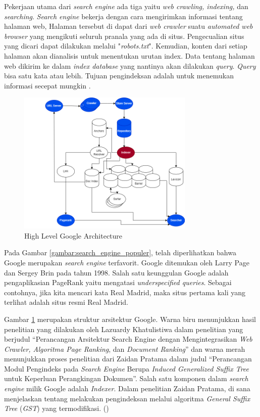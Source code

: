 Pekerjaan utama dari \textit{search engine} ada tiga yaitu \textit{web crawling, indexing,} dan \textit{searching}. \textit{Search engine} bekerja dengan cara mengirimkan informasi tentang halaman web, Halaman tersebut di dapat dari \textit{web crawler} suatu \textit{automated web browser} yang mengikuti seluruh pranala yang ada di situs. Pengecualian situs yang dicari dapat dilakukan melalui "\textit{robots.txt}". Kemudian, konten dari setiap halaman akan dianalisis untuk menentukan urutan index. Data tentang halaman web dikirim ke dalam \textit{index database} yang nantinya akan dilakukan \textit{query}. \textit{Query} bisa satu kata atau lebih. Tujuan pengindeksan adalah untuk menemukan informasi secepat mungkin \citep{seymour2011history}.

\begin{figure}[h]
    \centering
    \includegraphics[width=0.75\textwidth]{gambar/Skema Search Engine Google.png}
    \caption{High Level Google Architecture \citep{brin1998anatomy}}
    \label{gambar:high_level_google_architecture}
\end{figure}

Pada Gambar \ref{gambar:search_engine_populer}, telah diperlihatkan bahwa Google merupakan \textit{search engine} terfavorit. Google ditemukan oleh Larry Page dan Sergey Brin pada tahun 1998. Salah satu keunggulan Google adalah pengaplikasian PageRank  yaitu mengatasi \textit{underspecified queries}. Sebagai contohnya, jika kita mencari kata Real Madrid, maka situs pertama kali yang terlihat adalah situs resmi Real Madrid.

Gambar \ref{gambar:high_level_google_architecture} merupakan struktur arsitektur Google. Warna biru menunjukkan hasil penelitian yang dilakukan oleh Lazuardy Khatulistiwa dalam penelitian yang berjudul “Perancangan Arsitektur Search Engine dengan Mengintegrasikan \textit{Web Crawler, Algoritma Page Ranking}, dan \textit{Document Ranking}” dan warna merah menunjukkan proses penelitian dari Zaidan Pratama dalam judul “Perancangan Modul Pengindeks pada \textit{Search Engine} Berupa \textit{Induced Generalized Suffix Tree} untuk Keperluan Perangkingan Dokumen”.
Salah satu komponen dalam \textit{search engine} milik Google adalah \textit{Indexer}. Dalam penelitian Zaidan Pratama, di sana menjelaskan tentang melakukan pengindeksan melalui algoritma \textit{General Suffix Tree} (\textit{GST}) yang termodifikasi. (\cite{pratama2022igst})

